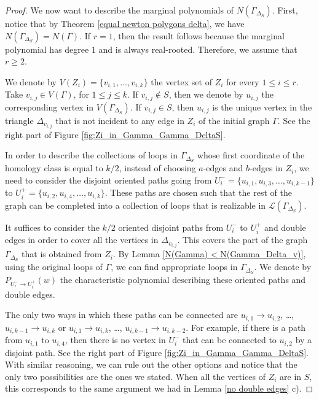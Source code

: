 \documentclass[12pt,a4paper]{article}
\theoremstyle{definition}
\begin{document}
\begin{proof}
    We now want to describe the marginal polynomials of $N(\Gamma_{\Delta_S})$. First, notice that by Theorem \ref{equal newton polygons delta}, we have $N(\Gamma_{\Delta_S}) = N(\Gamma)$. If $r = 1$, then the result follows because the marginal polynomial has degree $1$ and is always real-rooted. Therefore, we assume that $r \geq 2$.

    We denote by $V(Z_i) = \{v_{i,1}, \dots, v_{i,k}\}$ the vertex set of $Z_i$ for every $1 \leq i \leq r$. Take $v_{i,j} \in V(\Gamma)$, for $1 \leq j \leq k$. 
    If $v_{i,j} \notin S$, then we denote by $u_{i,j}$ the corresponding vertex in $V(\Gamma_{\Delta_S})$. If $v_{i,j} \in S$, then $u_{i,j}$ is the unique vertex in the triangle $\Delta_{v_{i,j}}$ that is not incident to any edge in $Z_i$ of the initial graph $\Gamma$. See the right part of Figure \ref{fig:Zi_in_Gamma_Gamma_DeltaS}.

    In order to describe the collections of loops in $\Gamma_{\Delta_S}$ whose first coordinate of the homology class is equal to $k/2$, instead of choosing $a$-edges and $b$-edges in $Z_i$, we need to consider the disjoint oriented paths going from $U^-_{i} = \{u_{i,1}, u_{i, 3}, \dots, u_{i, k-1}\}$ to $U^+_{i} = \{u_{i,2}, u_{i, 4}, \dots, u_{i, k}\}$. These paths are chosen such that the rest of the graph can be completed into a collection of loops that is realizable in $\mathcal{L}(\Gamma_{\Delta_S})$.

    It suffices to consider the $k/2$ oriented disjoint paths from $U^-_{i}$ to $U^+_{i}$ and double edges in order to cover all the vertices in $\Delta_{v_{i,j}}$. This covers the part of the graph $\Gamma_{\Delta_S}$ that is obtained from $Z_i$. By Lemma \ref{N(Gamma) < N(Gamma_Delta_v)}, using the original loops of $\Gamma$, we can find appropriate loops in $\Gamma_{\Delta_S}$. We denote by $P_{U^-_{i} \to U^+_{i}}(w)$ the characteristic polynomial describing these oriented paths and double edges.
    
    The only two ways in which these paths can be connected are $u_{i,1} \rightarrow u_{i,2}$, \dots, $u_{i,k-1} \rightarrow u_{i,k}$ or $u_{i,1} \rightarrow u_{i,k}$, \dots, $u_{i,k-1} \rightarrow u_{i,k-2}$. For example, if there is a path from $u_{i,1}$ to $u_{i,4}$, then there is no vertex in $U^-_{i}$ that can be connected to $u_{i,2}$ by a disjoint path. See the right part of Figure \ref{fig:Zi_in_Gamma_Gamma_DeltaS}. With similar reasoning, we can rule out the other options and notice that the only two possibilities are the ones we stated. When all the vertices of $Z_i$ are in $S$, this corresponds to the same argument we had in Lemma \ref{no double edges} c).


\end{proof}
\end{document}
